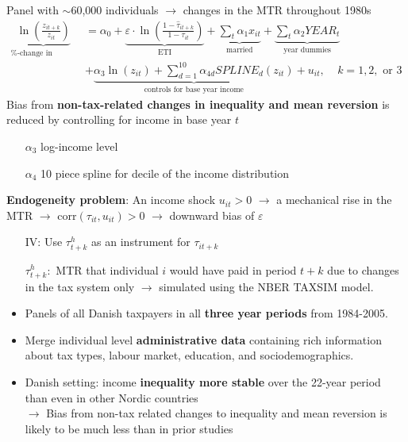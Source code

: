 \documentclass[8pt]{beamer}
\begin{document}
\begin{frame}{\citet{gruber2002elasticity}}
  Panel with $\sim$60,000 individuals $\rightarrow$ changes in the MTR throughout 1980s
  \begin{equation}
    \begin{split}
      \underbrace{\ln\left(\frac{z_{it+k}}{z_{it}}\right)}_\text{\%-change in income} &= \alpha_0 + \underbrace{\varepsilon\cdot \ln\left(\frac{1-\hat{\tau}_{it+k}}{1-\tau_{it}}\right)}_\text{ETI} + \underbrace{\sum_t\alpha_1 x_{it}}_\text{married} + \underbrace{\sum_t \alpha_2YEAR_t}_\text{year dummies} \\
       &+\underbrace{ \alpha_3\ln(z_{it}) + \sum_{d=1}^{10}\alpha_{4d}SPLINE_d(z_{it}) }_\text{controls for base year income} + u_{it},\ \ \ \ \ k=1,2,\text{ or }3
      \label{eq:IV}
    \end{split}
  \end{equation}
  Bias from \textbf{non-tax-related changes in inequality and mean reversion } is reduced by controlling for income in base year $t$
  \begin{itemize}
    \item[$\alpha_3$] log-income level
    \item[$\alpha_4$] 10 piece spline for decile of the income distribution
  \end{itemize}
  \textbf{Endogeneity problem}: An income shock $u_{it}>0$ $\rightarrow$ a mechanical rise in the MTR $\rightarrow$ corr$(\tau_{it},u_{it})>0$ $\rightarrow$ downward bias of $\varepsilon$
  \begin{itemize}
    \item[IV:] Use $\tau^h_{t+k}$ as an instrument for $\tau_{it+k}$
    \item[$\tau^h_{t+k}:$] MTR that individual $i$ would have paid in period $t+k$ due to changes in the tax system only $\rightarrow$ simulated using the NBER TAXSIM model.
  \end{itemize}
\end{frame}


\begin{frame}{\citet{kleven2014estimating}}
  \begin{itemize}
    \item Panels of all Danish taxpayers in all \textbf{three year periods} from 1984-2005.
    \item Merge individual level \textbf{administrative data} containing rich information about tax types, labour market, education, and sociodemographics.
    \item Danish setting: income \textbf{inequality more stable} over the 22-year period than even in other Nordic countries \\
    $\rightarrow$ Bias from non-tax related changes to inequality and mean reversion is likely to be much less than in prior studies
  \end{itemize}
\end{frame}
\end{document}
